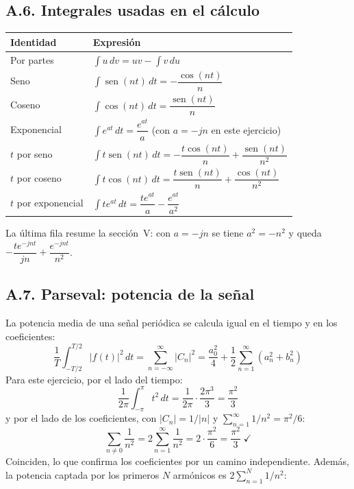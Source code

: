 \documentclass[11pt,a4paper]{article}
\DeclareMathOperator{\sen}{sen}
\begin{document}
\subsection*{A.6. Integrales usadas en el cálculo}
\begin{table}[H]
\centering
\renewcommand{\arraystretch}{1.7}
\begin{tabularx}{\textwidth}{>{\raggedright\arraybackslash}p{4.4cm}X}
\toprule
\textbf{Identidad} & \textbf{Expresión}\\
\midrule
Por partes & $\displaystyle\int u\,dv=uv-\int v\,du$\\
Seno & $\displaystyle\int\sen(nt)\,dt=-\dfrac{\cos(nt)}{n}$\\
Coseno & $\displaystyle\int\cos(nt)\,dt=\dfrac{\sen(nt)}{n}$\\
Exponencial & $\displaystyle\int e^{at}\,dt=\dfrac{e^{at}}{a}$ (con $a=-jn$ en este ejercicio)\\
$t$ por seno & $\displaystyle\int t\sen(nt)\,dt=-\dfrac{t\cos(nt)}{n}+\dfrac{\sen(nt)}{n^{2}}$\\
$t$ por coseno & $\displaystyle\int t\cos(nt)\,dt=\dfrac{t\sen(nt)}{n}+\dfrac{\cos(nt)}{n^{2}}$\\
$t$ por exponencial & $\displaystyle\int te^{at}\,dt=\dfrac{te^{at}}{a}-\dfrac{e^{at}}{a^{2}}$\\
\bottomrule
\end{tabularx}
\end{table}
La última fila resume la sección~V: con $a=-jn$ se tiene $a^{2}=-n^{2}$ y queda
$-\dfrac{te^{-jnt}}{jn}+\dfrac{e^{-jnt}}{n^{2}}$.

\subsection*{A.7. Parseval: potencia de la señal}
La potencia media de una señal periódica se calcula igual en el tiempo y en los coeficientes:
\begin{equation*}
  \boxed{\frac{1}{T}\int_{-T/2}^{T/2}|f(t)|^{2}\,dt=\sum_{n=-\infty}^{\infty}|C_n|^{2}
  =\frac{a_0^{2}}{4}+\frac{1}{2}\sum_{n=1}^{\infty}\left(a_n^{2}+b_n^{2}\right)}
\end{equation*}
Para este ejercicio, por el lado del tiempo:
\begin{equation*}
  \frac{1}{2\pi}\int_{-\pi}^{\pi}t^{2}\,dt=\frac{1}{2\pi}\cdot\frac{2\pi^{3}}{3}=\frac{\pi^{2}}{3}
\end{equation*}
y por el lado de los coeficientes, con $|C_n|=1/|n|$ y $\sum_{n=1}^{\infty}1/n^{2}=\pi^{2}/6$:
\begin{equation*}
  \sum_{n\neq0}\frac{1}{n^{2}}=2\sum_{n=1}^{\infty}\frac{1}{n^{2}}=2\cdot\frac{\pi^{2}}{6}=\frac{\pi^{2}}{3}\;\checkmark
\end{equation*}
Coinciden, lo que confirma los coeficientes por un camino independiente. Además, la potencia
captada por los primeros $N$ armónicos es $2\sum_{n=1}^{N}1/n^{2}$:
\end{document}
